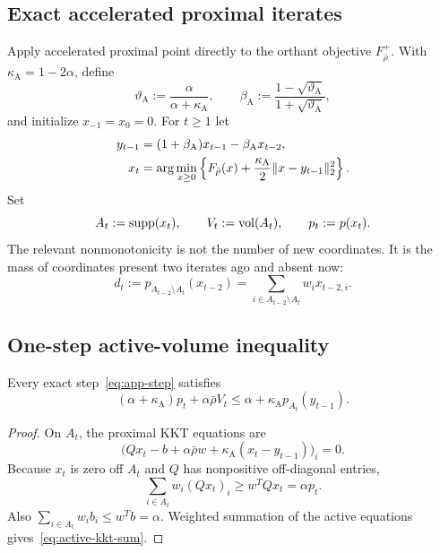 \subsection{Exact accelerated proximal iterates}

Apply accelerated proximal point directly to the orthant objective
$F_{\bar\rho}^+$. With $\kappa_{\mathrm A}=1-2\alpha$, define
\begin{equation}
 \vartheta_{\mathrm A}:=
 \frac{\alpha}{\alpha+\kappa_{\mathrm A}},
 \qquad
 \beta_{\mathrm A}:=
 \frac{1-\sqrt{\vartheta_{\mathrm A}}}
      {1+\sqrt{\vartheta_{\mathrm A}}},
 \label{eq:app-momentum}
\end{equation}
and initialize $x_{-1}=x_0=0$.  For $t\ge1$ let
\begin{align}
 y_{t-1}&=(1+\beta_{\mathrm A})x_{t-1}-\beta_{\mathrm A} x_{t-2},
 \label{eq:app-center}\\
 x_t&=\arg\min_{x\ge0}
 \left\{F_{\bar\rho}(x)
 +\frac{\kappa_{\mathrm A}}{2}\lVert x-y_{t-1}\rVert_2^2\right\}.
 \label{eq:app-step}
\end{align}
Set
\[
 A_t:=\operatorname{supp}(x_t),
 \qquad V_t:=\operatorname{vol}(A_t),
 \qquad p_t:=p(x_t).
\]
The relevant nonmonotonicity is not the number of new coordinates.  It is the
mass of coordinates present two iterates ago and absent now:
\begin{equation}
 d_t
 :=p_{A_{t-2}\setminus A_t}(x_{t-2})
 =\sum_{i\in A_{t-2}\setminus A_t}w_i x_{t-2,i}.
 \label{eq:dropout-mass}
\end{equation}

\subsection{One-step active-volume inequality}

\begin{lemma}
\label{lem:active-kkt-sum}
Every exact step~\eqref{eq:app-step} satisfies
\begin{equation}
 (\alpha+\kappa_{\mathrm A})p_t+\alpha\bar\rho V_t
 \le \alpha+\kappa_{\mathrm A} p_{A_t}(y_{t-1}).
 \label{eq:active-kkt-sum}
\end{equation}
\end{lemma}

\begin{proof}
On $A_t$, the proximal KKT equations are
\[
 \bigl(Qx_t-b+\alpha\bar\rho w
       +\kappa_{\mathrm A}(x_t-y_{t-1})\bigr)_i=0.
\]
Because $x_t$ is zero off $A_t$ and $Q$ has nonpositive off-diagonal
entries,
\[
 \sum_{i\in A_t}w_i(Qx_t)_i
 \ge w^TQx_t=\alpha p_t.
\]
Also $\sum_{i\in A_t}w_i b_i\le w^Tb=\alpha$.  Weighted summation of the
active equations gives~\eqref{eq:active-kkt-sum}.
\end{proof}

